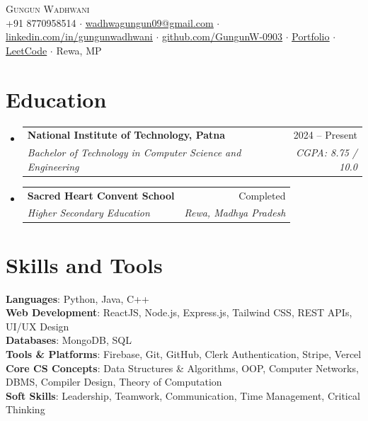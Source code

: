 \documentclass[letterpaper,11pt]{article}
\makeatletter
\newcommand{\resumeSubheading}[4]{
  \vspace{-2pt}\item
    \begin{tabular*}{0.97\textwidth}[t]{l@{\extracolsep{\fill}}r}
      \textbf{#1} & #2 \\
      \textit{\small#3} & \textit{\small #4} \\
    \end{tabular*}\vspace{-7pt}
}
\newcommand{\resumeSubHeadingListStart}{\begin{itemize}[leftmargin=0.15in, label={}]}
\newcommand{\resumeSubHeadingListEnd}{\end{itemize}}
\makeatother
\begin{document}
\begin{center}
    {\Huge \scshape Gungun Wadhwani} \\ \vspace{5pt}
    \small
    +91 8770958514 $\cdot$
    \href{mailto:wadhwagungun09@gmail.com}{\underline{wadhwagungun09@gmail.com}} $\cdot$
    \href{https://linkedin.com/in/gungunwadhwani}{\underline{linkedin.com/in/gungunwadhwani}} $\cdot$
    \href{https://github.com/GungunW-0903}{\underline{github.com/GungunW-0903}} $\cdot$
    \href{https://gungunw-0903.github.io}{\underline{Portfolio}} $\cdot$
    \href{https://leetcode.com/u/GungunW-0903/}{\underline{LeetCode}} $\cdot$
    Rewa, MP
\end{center}

\section{Education}
  \resumeSubHeadingListStart
    \resumeSubheading
      {National Institute of Technology, Patna}{2024 -- Present}
      {Bachelor of Technology in Computer Science and Engineering}{CGPA: 8.75 / 10.0}
    \resumeSubheading
      {Sacred Heart Convent School}{Completed}
      {Higher Secondary Education}{Rewa, Madhya Pradesh}
  \resumeSubHeadingListEnd

\section{Skills and Tools}
 \begin{itemize}[leftmargin=0.15in, label={}]
    \small{\item{
     \textbf{Languages}{: Python, Java, C++} \\[2pt]
     \textbf{Web Development}{: ReactJS, Node.js, Express.js, Tailwind CSS, REST APIs, UI/UX Design} \\[2pt]
     \textbf{Databases}{: MongoDB, SQL} \\[2pt]
     \textbf{Tools \& Platforms}{: Firebase, Git, GitHub, Clerk Authentication, Stripe, Vercel} \\[2pt]
     \textbf{Core CS Concepts}{: Data Structures \& Algorithms, OOP, Computer Networks, DBMS, Compiler Design, Theory of Computation} \\[2pt]
     \textbf{Soft Skills}{: Leadership, Teamwork, Communication, Time Management, Critical Thinking}
    }}
 \end{itemize}
 \vspace{-10pt}
\end{document}
